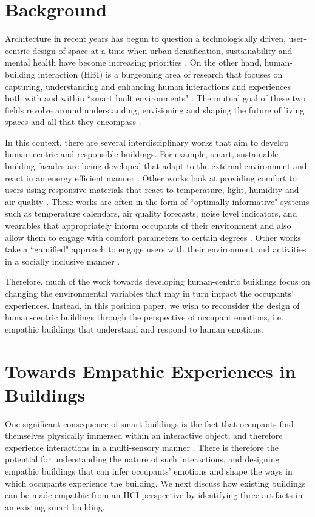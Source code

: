 \documentclass [sigconf, review, anonymous] {acmart}
\begin{document}
\section{Background}
Architecture in recent years has begun to question a technologically driven, user-centric design of space at a time when urban densification, sustainability and mental health have become increasing priorities \cite{derix2014empathic}. On the other hand, human-building interaction (HBI) is a burgeoning area of research that focuses on capturing, understanding and enhancing human interactions and experiences both with and within ``smart built environments" \cite{alavi2016future}. The mutual goal of these two fields revolve around understanding,  envisioning and shaping the future of living spaces and all that they encompass \cite{nembrini2017human, alavi2018artifacts}. 

In this context, there are several interdisciplinary works that aim to develop human-centric and responsible buildings. For example, smart, sustainable building facades are being developed that adapt to the external environment and react in an energy efficient manner \cite{ahmed2015development}. Other works look at providing comfort to users using responsive materials that react to temperature, light, humidity and air quality \cite{fragkia2020exergy, holstov2015hygromorphic}. These works are often in the form of ``optimally informative" systems such as temperature calendars, air quality forecasts, noise level indicators, and wearables that appropriately inform occupants of their environment and also allow them to engage with comfort parameters to certain degrees  \cite{costanza2016bit, kim2020designing}. Other works take a ``gamified" approach to engage users with their environment and activities in a socially inclusive manner \cite{mathur2015tiny, zhong2022augmenting}. 

Therefore, much of the work towards developing human-centric buildings focus on changing the environmental variables that may in turn impact the occupants' experiences. Instead, in this position paper, we wish to reconsider the design of human-centric buildings through the perspective of occupant emotions, i.e. empathic buildings that understand and respond to human emotions.


\section{Towards Empathic Experiences in Buildings}
\label{sec:empathic-buildings}
One significant consequence of smart buildings is the fact that occupants find themselves physically immersed within an interactive object, and therefore experience interactions in a multi-sensory manner \cite{nembrini2017human}. There is therefore the potential for understanding the nature of such interactions, and designing empathic buildings that can infer occupants' emotions and shape the ways in which occupants experience the building. We next discuss how existing buildings can be made empathic from an HCI perspective by identifying three artifacts in an existing smart building.  
 
\end{document}
